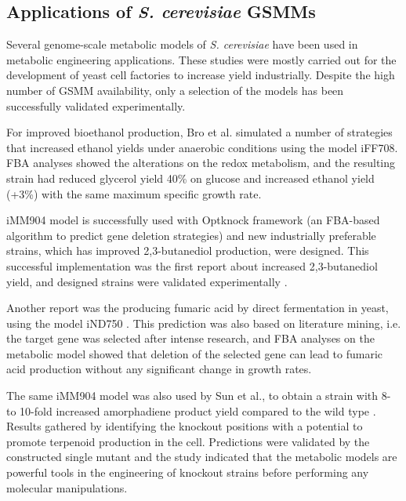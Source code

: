 \subsection{Applications of \emph{S. cerevisiae} GSMMs}
Several genome-scale metabolic models of \emph{S. cerevisiae} have been used in metabolic engineering applications. These studies were mostly carried out for the development of yeast cell factories to increase yield industrially. Despite the high number of GSMM availability, only a selection of the models has been successfully validated experimentally.

For improved bioethanol production, Bro et al. simulated a number of strategies that increased ethanol yields under anaerobic conditions using the model 	iFF708\cite{bro2006silico}. FBA analyses showed the alterations on the redox metabolism, and the resulting strain had reduced glycerol yield 40\% on glucose and increased ethanol yield (+3\%) with the same maximum specific growth rate.

iMM904 model is successfully used with Optknock framework \cite{burgard2003optknock} (an FBA-based algorithm to predict gene deletion strategies) and new industrially preferable strains, which has improved 2,3-butanediol production, were designed. This successful implementation was the first report about increased 2,3-butanediol yield, and designed strains were validated experimentally \cite{ng2012production}.

Another report was the producing fumaric acid by direct fermentation in yeast, using the model iND750 \cite{xu2012fumaric}. This prediction was also based on literature mining, i.e. the target gene was selected after intense research, and FBA analyses on the metabolic model showed that deletion of the selected gene can lead to fumaric acid production without any significant change in growth rates.

The same iMM904 model was also used by Sun et al., to obtain a strain with 8- to 10-fold increased amorphadiene product yield compared to the wild type \cite{sun2014identification}. Results gathered by identifying the knockout positions with a potential to promote terpenoid production in the cell. Predictions were validated by the constructed single mutant and the study indicated that the metabolic models are powerful tools in the engineering of knockout strains before performing any molecular manipulations.
